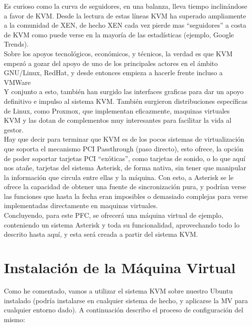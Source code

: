 Es curioso como la curva de seguidores, en una balanza, lleva tiempo inclinándose a favor de KVM. Desde la lectura de estas líneas KVM ha superado ampliamente a la comunidad de XEN, de hecho XEN cada vez pierde mas “seguidores” a costa de KVM como puede verse en la mayoría de las estadísticas (ejemplo, Google Trends).\\

Sobre los apoyos tecnológicos, económicos, y técnicos, la verdad es que KVM empezó a gozar del apoyo de uno de los principales actores en el ámbito GNU/Linux, RedHat, y desde entonces empieza a hacerle frente incluso a VMWare\\

Y conjunto a esto, también han surgido las interfaces graficas para dar un apoyo definitivo e impulso al sistema KVM. También surgieron distribuciones específicas de Linux, como Proxmox, que implementan eficazmente, maquinas virtuales KVM y las dotan de complementos muy interesantes para facilitar la vida al gestor.\\

Hay que decir para terminar que KVM es de los pocos sistemas de virtualización que soporta el mecanismo PCI Passthrough (paso directo), esto ofrece, la opción de poder soportar tarjetas PCI “exóticas”, como tarjetas de sonido, o lo que aquí nos atañe, tarjetas del sistema Asterisk, de forma nativa, sin tener que manipular la información que circula entre ellas y la máquina. Con esto, a Asterisk se le ofrece la capacidad de obtener una fuente de sincronización pura, y podrían verse las funciones que hasta la fecha eran imposibles o demasiado complejas para verse implementadas directamente en maquinas virtuales.\\

Concluyendo, para este PFC, se ofrecerá una máquina virtual de ejemplo, conteniendo un sistema Asterisk y toda su funcionalidad, aprovechando todo lo descrito hasta aquí, y esta será creada a partir del sistema KVM.\\

\section{Instalación de la Máquina Virtual}

Como he comentado, vamos a utilizar el sistema KVM sobre nuestro Ubuntu instalado (podría instalarse en cualquier sistema de hecho, y aplicarse la MV para cualquier entorno dado). A continuación describo el proceso de configuración del mismo:\\

